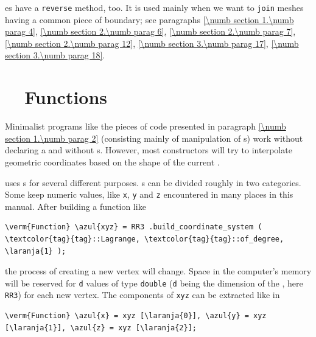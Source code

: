 {\small\tt {}}es have a {\small\tt reverse} method, too.
It is used mainly when we want to {\small\tt join} meshes having a common piece of boundary;
see paragraphs \ref{\numb section 1.\numb parag 4}, \ref{\numb section 2.\numb parag 6},
\ref{\numb section 2.\numb parag 7}, \ref{\numb section 2.\numb parag 12},
\ref{\numb section 3.\numb parag 17}, \ref{\numb section 3.\numb parag 18}.


\section{~~Functions}\label{\numb section 1.\numb parag 3}

Minimalist programs like the pieces of code presented in paragraph
\ref{\numb section 1.\numb parag 2} (consisting mainly of manipulation of
{\small\tt{}}s) work without declaring a {\small\tt{}}
and without {\small\tt{}}s.
However, most {\small\tt{}} constructors will try to interpolate geometric coordinates
based on the shape of the current {\small\tt{}}.

{\ManiFEM} uses {\small\tt{}}s for several different purposes.
{\small\tt{}}s can be divided roughly in two categories.
Some keep numeric values, like {\small\tt x}, {\small\tt y} and {\small\tt z}
encountered in many places in this manual.
After building a function like

\begin{Verbatim}[commandchars=\\\{\},formatcom=\small\tt,baselinestretch=0.94]
   \verm{Function} \azul{xyz} = RR3 .build_coordinate_system ( \textcolor{tag}{tag}::Lagrange, \textcolor{tag}{tag}::of_degree, \laranja{1} );
\end{Verbatim}

\noindent the process of creating a new vertex will change.
Space in the computer's memory will be reserved for {\small\tt d} values of type
{\small\tt double} ({\small\tt d} being the dimension of the {\small\tt{}},
here {\small\tt RR3}) for each new vertex.
The components of {\small\tt xyz} can be extracted like in

\begin{Verbatim}[commandchars=\\\{\},formatcom=\small\tt,baselinestretch=0.94]
   \verm{Function} \azul{x} = xyz [\laranja{0}], \azul{y} = xyz [\laranja{1}], \azul{z} = xyz [\laranja{2}];
\end{Verbatim}

